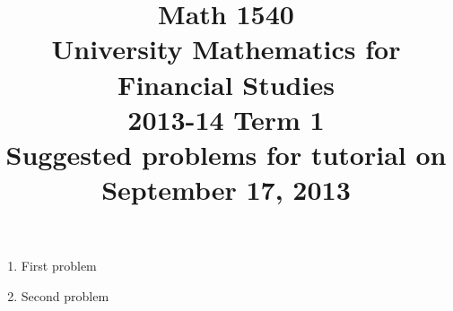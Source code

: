 \documentclass[8pt]{article} %
\title{Math 1540\\University Mathematics for Financial Studies\\2013-14 Term 1\\Suggested problems for tutorial on\\September 17, 2013}
\begin{document}
\maketitle
\begin{enumerate}
	\item{First problem}%
	\item{Second problem}%
\end{enumerate}
\end{document}
